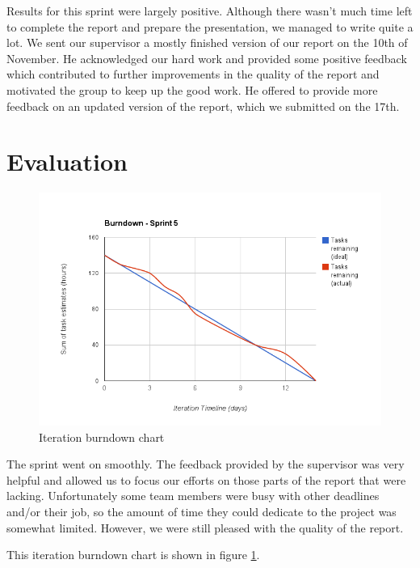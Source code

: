 Results for this sprint were largely positive. Although there wasn't much
time left to complete the report and prepare the presentation,
we managed to write quite a lot. We sent our supervisor a mostly finished version of our report on
the 10th of November. He acknowledged our hard work and provided some positive feedback
which contributed to further improvements in the quality of the report and motivated the group
to keep up the good work. He offered to provide more feedback on an updated version of the report,
which we submitted on the 17th.

\section{Evaluation}

\begin{figure}
\centering
\includegraphics[scale=0.60]{../Figures/burndownSprint5.png}
\caption{Iteration burndown chart}
\label{figure:burndownsprint5}
\end{figure}

The sprint went on smoothly. The feedback provided by the supervisor was very helpful
and allowed us to focus our efforts on those parts of the report that were lacking.
Unfortunately some team members were busy with other deadlines and/or their job, so the amount
of time they could dedicate to the project was somewhat limited.
However, we were still pleased with the quality of the report.

This iteration burndown chart is shown in figure \ref{figure:burndownsprint5}.


